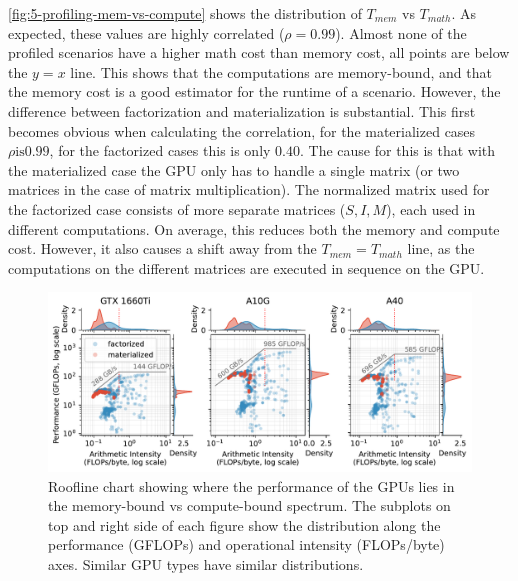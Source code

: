\autoref{fig:5-profiling-mem-vs-compute} shows the distribution of $T_{mem}$ vs $T_{math}$. As expected, these values are highly correlated ($\rho = 0.99$). Almost none of the profiled scenarios have a higher math cost than memory cost, all points are below the $y=x$ line. This shows that the computations are memory-bound, and that the memory cost is a good estimator for the runtime of a scenario. However, the difference between factorization and materialization is substantial. This first becomes obvious when calculating the correlation, for the materialized cases $\rho \text{is} 0.99$, for the factorized cases this is only $0.40$. The cause for this is that with the materialized case the GPU only has to handle a single matrix (or two matrices in the case of matrix multiplication). The normalized matrix used for the factorized case consists of more separate matrices ($S,I,M$), each used in different computations. On average, this reduces both the memory and compute cost. However, it also causes a shift away from the $T_{mem} = T_{math}$ line, as the computations on the different matrices are executed in sequence on the GPU.

\begin{figure}
    \centering
    \includegraphics[width=\linewidth]{chapters/05_cost_estimation/figures/roofline-plot.pdf}
    \caption[Roofline chart comparing F/M, per GPU]{Roofline chart showing where the performance of the GPUs lies in the memory-bound vs compute-bound spectrum. The subplots on top and right side of each figure show the distribution along the performance (GFLOPs) and operational intensity (FLOPs/byte) axes. Similar GPU types have similar distributions.}
    \label{fig:5-roofline-plot}
\end{figure}


